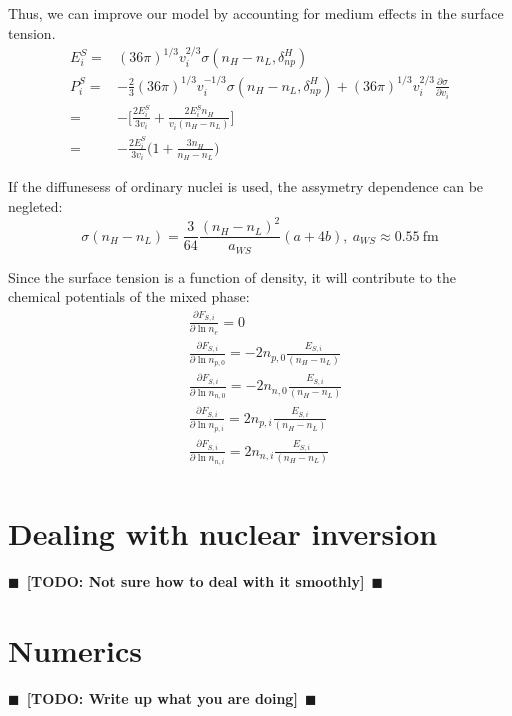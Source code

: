 \documentclass[11pt,letter]{article}
\newcommand{\todo}[1]{{$\blacksquare$~\textbf{\color{blue}[TODO: #1]}}~$\blacksquare$}
\begin{document}
Thus, 
we can improve our model by accounting for medium effects in the surface tension.
\begin{equation}
 \begin{split}
  E_i^S=& (36\pi)^{1/3}v_i^{2/3}\sigma(n_H-n_L,\delta^H_{np})\\
  P_i^S=&-\frac{2}{3}(36\pi)^{1/3}v_i^{-1/3}\sigma(n_H-n_L,\delta^H_{np})+ (36\pi)^{1/3}v_i^{2/3} \frac{\partial \sigma}{\partial v_i}\\
  =&-\Big[\frac{2E_i^S}{3v_i}+\frac{2 E_i^Sn_H}{v_i(n_H-n_L)}\Big]\\
  =&- \frac{2E_i^S}{3v_i} \Big(1+\frac{3 n_H}{n_H-n_L}\Big)
 \end{split}
\end{equation}

If the diffunesess of ordinary nuclei is used, the assymetry dependence can be negleted:\
\begin{equation}
 \sigma(n_H-n_L) = \frac{3}{64} \frac{(n_H-n_L)^2}{a_{WS}}  (a  +4 b),\ a_{WS}\approx 0.55\ \text{fm}
\end{equation}

Since the surface tension is a function of density, it will contribute to the chemical potentials of the mixed phase:
\begin{equation}
 \begin{split}
  &\frac{\partial F_{S,i}}{\partial \ln n_e} = 0\\
  &\frac{\partial F_{S,i}}{\partial \ln n_{p,0}} = -2 n_{p,0}\frac{E_{S,i}}{(n_H-n_L)}\\
  &\frac{\partial F_{S,i}}{\partial \ln n_{n,0}} = -2 n_{n,0}\frac{E_{S,i}}{(n_H-n_L)}\\
  &\frac{\partial F_{S,i}}{\partial \ln n_{p,i}} = 2 n_{p,i}\frac{E_{S,i}}{(n_H-n_L)}\\
  &\frac{\partial F_{S,i}}{\partial \ln n_{n,i}} = 2 n_{n,i}\frac{E_{S,i}}{(n_H-n_L)}\\
  \end{split}
\end{equation}


\section{Dealing with nuclear inversion}
\todo{Not sure how to deal with it smoothly} 

\section{Numerics}
\todo{Write up what you are doing} 
\end{document}
